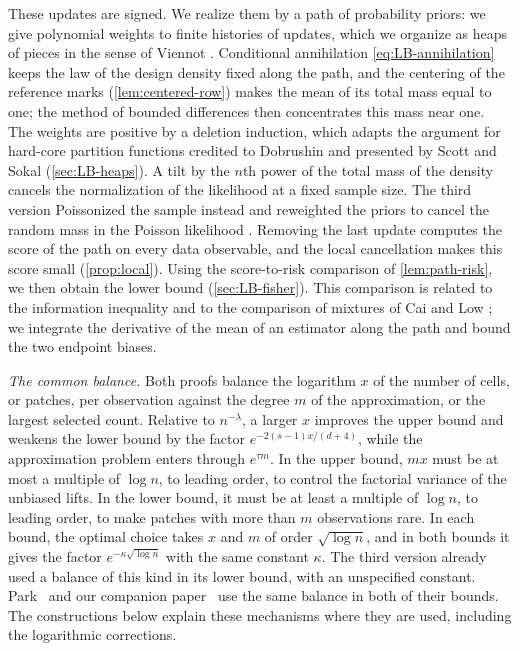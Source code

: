 These updates are signed. We realize them by a path of probability
priors: we give polynomial weights to finite histories of updates,
which we organize as heaps of pieces in the sense of Viennot
\cite{Viennot1986}. Conditional annihilation \eqref{eq:LB-annihilation}
keeps the law of the design density fixed along the path, and the
centering of the reference marks (\cref{lem:centered-row}) makes the
mean of its total mass equal to one; the method of bounded differences
then concentrates this mass near one. The weights are positive by a
deletion induction, which adapts the argument for hard-core partition
functions credited to Dobrushin and presented by Scott and Sokal
\cite[Section~5.1]{ScottSokal2005} (\cref{sec:LB-heaps}). A tilt by the
$n$th power of the total mass of the density cancels the normalization
of the likelihood at a fixed sample size. The third version Poissonized
the sample instead and reweighted the priors to cancel the random mass
in the Poisson likelihood \cite[Section~1.2, Step~3]{AronowLopatto2026v3}. Removing the last update computes
the score of the path on every data observable, and the local
cancellation makes this score small (\cref{prop:local}). Using the
score-to-risk comparison of \cref{lem:path-risk}, we then obtain the
lower bound (\cref{sec:LB-fisher}). This comparison is related to the information
inequality \cite[Chapter~2, Theorem~5.10]{LehmannCasella1998} and to
the comparison of mixtures of Cai and Low \cite[Section~2]{CaiLow2011};
we integrate the derivative of the mean of an estimator along the path
and bound the two endpoint biases.

\emph{The common balance.} Both proofs balance the logarithm $x$ of the
number of cells, or patches, per observation against the degree $m$ of
the approximation, or the largest selected count. Relative to
$n^{-\lambda}$, a larger $x$ improves the upper bound and weakens the
lower bound by the factor $e^{-2(s-1)x/(d+4)}$, while the approximation
problem enters through $e^{\tau m}$. In the upper bound, $mx$ must be at
most a multiple of $\log n$, to leading order, to control the factorial
variance of the unbiased lifts. In the lower bound, it must be at least
a multiple of $\log n$, to leading order, to make patches with more than
$m$ observations rare. In each bound, the optimal choice takes $x$ and
$m$ of order
$\sqrt{\log n}$, and in both bounds it gives the factor
$e^{-\kappa\sqrt{\log n}}$ with the same constant $\kappa$. The third
version already used a balance of this kind in its lower bound, with an
unspecified constant. Park~\cite[Sections~2 and~3.4]{Park2026} and our
companion paper~\cite[Section~1.3]{AronowKallusLopatto2026} use the same
balance in both of their bounds. The constructions below explain
these mechanisms where they are used, including the logarithmic
corrections.

